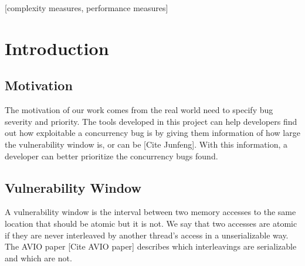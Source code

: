 \documentclass{acm_proc_article-sp}
\begin{document}
\maketitle
\begin{abstract}
This paper provides a sample of a \LaTeX\ document which conforms to
the formatting guidelines for ACM SIG Proceedings.
It complements the document \textit{Author's Guide to Preparing
ACM SIG Proceedings Using \LaTeX$2_\epsilon$\ and Bib\TeX}. This
source file has been written with the intention of being
compiled under \LaTeX$2_\epsilon$\ and BibTeX.

The developers have tried to include every imaginable sort
of ``bells and whistles", such as a subtitle, footnotes on
title, subtitle and authors, as well as in the text, and
every optional component (e.g. Acknowledgments, Additional
Authors, Appendices), not to mention examples of
equations, theorems, tables and figures.

To make best use of this sample document, run it through \LaTeX\
and BibTeX, and compare this source code with the printed
output produced by the dvi file.
\end{abstract}

[complexity measures, performance measures]



\section{Introduction}

\subsection{Motivation}
The motivation of our work comes from the real world need to specify bug severity and priority. The tools developed in this project can help developers find out how exploitable a concurrency bug is by giving them information of how large the vulnerability window is, or can be [Cite Junfeng]. With this information, a developer can better prioritize the concurrency bugs found.


\subsection{Vulnerability Window}
A vulnerability window is the interval between two memory accesses to the same location that should be atomic but it is not. We say that two accesses are atomic if they are never interleaved by another thread’s access in a unserializable way. The AVIO paper [Cite AVIO paper] describes which interleavings are serializable and which are not.
\end{document}
